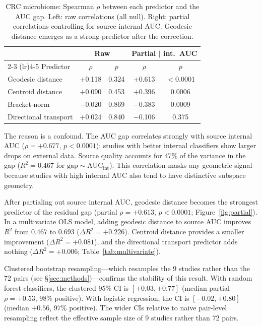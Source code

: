 \documentclass[11pt]{article}
\begin{document}
\begin{table}[t]
\centering
\caption{CRC microbiome: Spearman $\rho$ between each predictor and the AUC gap. Left: raw correlations (all null). Right: partial correlations controlling for source internal AUC. Geodesic distance emerges as a strong predictor after the correction.}
\label{tab:raw_crc}
\begin{tabular}{lcccc}
\toprule
 & \multicolumn{2}{c}{Raw} & \multicolumn{2}{c}{Partial $|$ int.\ AUC} \\
\cmidrule(lr){2-3} \cmidrule(lr){4-5}
Predictor & $\rho$ & $p$ & $\rho$ & $p$ \\
\midrule
Geodesic distance        & $+$0.118 & 0.324 & $+$0.613 & $<$0.0001 \\
Centroid distance        & $+$0.090 & 0.453 & $+$0.396 & 0.0006 \\
Bracket-norm             & $-$0.020 & 0.869 & $-$0.383 & 0.0009 \\
Directional transport    & $+$0.024 & 0.840 & $-$0.106 & 0.375 \\
\bottomrule
\end{tabular}
\end{table}

The reason is a confound. The AUC gap correlates strongly with source internal AUC ($\rho = +0.677$, $p < 0.0001$): studies with better internal classifiers show larger drops on external data. Source quality accounts for 47\% of the variance in the gap ($R^2 = 0.467$ for $\text{gap} \sim \text{AUC}_{\mathrm{int}}$). This correlation masks any geometric signal because studies with high internal AUC also tend to have distinctive subspace geometry.

After partialing out source internal AUC, geodesic distance becomes the strongest predictor of the residual gap (partial $\rho = +0.613$, $p < 0.0001$; Figure~\ref{fig:partial}). In a multivariate OLS model, adding geodesic distance to source AUC improves $R^2$ from 0.467 to 0.693 ($\Delta R^2 = +0.226$). Centroid distance provides a smaller improvement ($\Delta R^2 = +0.081$), and the directional transport predictor adds nothing ($\Delta R^2 = +0.006$; Table~\ref{tab:multivariate}).

Clustered bootstrap resampling---which resamples the 9 studies rather than the 72 pairs (see \S\ref{sec:methods})---confirms the stability of this result. With random forest classifiers, the clustered 95\% CI is $[+0.03, +0.77]$ (median partial $\rho = +0.53$, 98\% positive). With logistic regression, the CI is $[-0.02, +0.80]$ (median $+0.56$, 97\% positive). The wider CIs relative to naive pair-level resampling reflect the effective sample size of 9 studies rather than 72 pairs.
\end{document}
